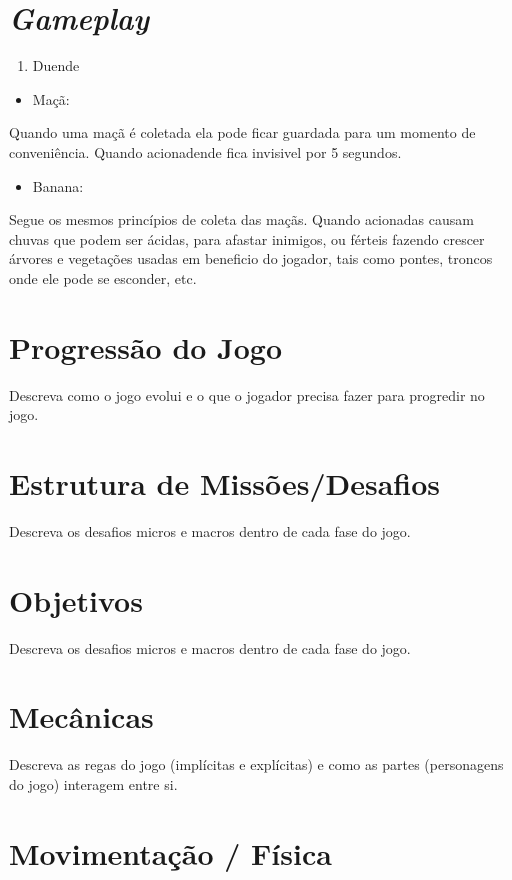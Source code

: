 \section{\textit{Gameplay}}
\begin{enumerate}
\item Duende
\end{enumerate}
\begin{itemize}
\item Maçã:
\end{itemize}
Quando uma maçã é coletada ela pode ficar guardada para um momento de conveniência. Quando acionadende fica invisivel por 5 segundos.
\begin{itemize}
\item Banana:
\end{itemize}
Segue os mesmos princípios de coleta das maçãs. Quando acionadas causam chuvas que podem ser ácidas, para afastar inimigos, ou férteis fazendo crescer árvores e vegetações usadas em beneficio do jogador, tais como pontes, troncos onde ele pode se esconder, etc.

\section{Progressão do Jogo}

Descreva como o jogo evolui e o que o jogador precisa fazer para progredir no jogo.

\section{Estrutura de Missões/Desafios}

Descreva os desafios micros e macros dentro de cada fase do jogo.

\section{Objetivos}

Descreva os desafios micros e macros dentro de cada fase do jogo.

\section{Mecânicas}

Descreva as regas do jogo (implícitas e explícitas) e como as partes (personagens do jogo) interagem entre si.

\section{Movimentação / Física}

